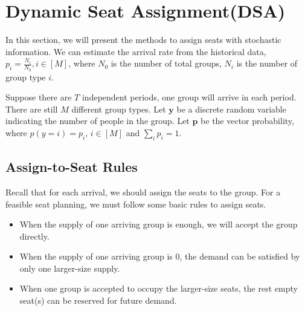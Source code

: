 
\section{Dynamic Seat Assignment(DSA)}
In this section, we will present the methods to assign seats with stochastic information.
We can estimate the arrival rate from the historical data, $p_i = \frac{N_{i}}{N_{0}}, i \in [M]$, where $N_{0}$ is the number of total groups, $N_{i}$ is the number of group type $i$.

Suppose there are $T$ independent periods, one group will arrive in each period.
There are still $M$ different group types. Let $\mathbf{y}$ be a discrete random variable indicating the number of people in the group. Let $\mathbf{p}$ be the vector probability, where $p(y = i) = p_i$, $i \in [M]$ and $\sum_{i} p_{i} =1$. 





\subsection{Assign-to-Seat Rules}\label{nested_policy}
Recall that for each arrival, we should assign the seats to the group. 
For a feasible seat planning, we must follow some basic rules to assign seats.
\begin{itemize}
    \item When the supply of one arriving group is enough, we will accept the group directly.
    \item When the supply of one arriving group is 0, the demand can be satisfied by only one larger-size supply.
    \item When one group is accepted to occupy the larger-size seats, the rest empty seat(s) can be reserved for future demand.
\end{itemize}

